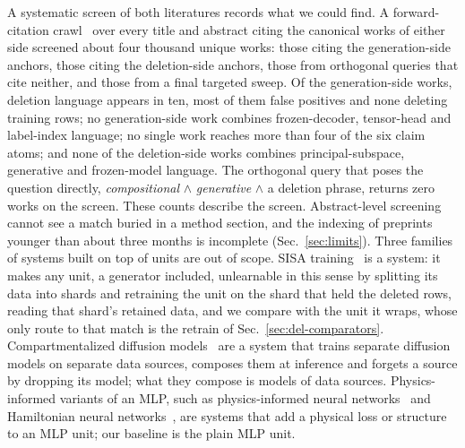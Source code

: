 \documentclass{article} %
\begin{document}
A systematic screen of both literatures records what we could find. A
forward-citation crawl~\citep{priem_openalex_2022} over every title and abstract citing the canonical works of either side
screened about four thousand unique works: those citing the generation-side anchors, those citing
the deletion-side anchors, those from orthogonal queries that cite neither, and those from
a final targeted sweep. %
Of the generation-side works, deletion language appears in ten, most of them
false positives and none deleting training rows; no generation-side work combines frozen-decoder, tensor-head
and label-index language; no single work reaches more than four of the six claim atoms;
and none of the deletion-side works combines principal-subspace, generative and
frozen-model language. %
The orthogonal query that poses the question directly, \emph{compositional} $\wedge$
\emph{generative} $\wedge$ a deletion phrase, returns zero works on the screen.
These counts describe the screen. Abstract-level
screening cannot see a match buried in a method section, and the indexing of preprints younger
than about three months is incomplete (Sec.~\ref{sec:limits}).
Three families of systems built on top of units are out of scope.
SISA training~\citep{bourtoule_machine_2021} is a system: it makes any unit, a generator included,
unlearnable in this sense by splitting its data into shards and retraining the unit on the shard that
held the deleted rows, reading that shard's retained data, and we compare with the unit it wraps,
whose only route to that match is the retrain of Sec.~\ref{sec:del-comparators}.
Compartmentalized diffusion models~\citep{golatkar_training_2024} are a system that
trains separate diffusion models on separate data sources, composes them at inference and forgets a
source by dropping its model; what they compose is models of data sources.
Physics-informed variants of an MLP, such as physics-informed neural
networks~\citep{raissi_physics-informed_2019} and Hamiltonian neural networks~\citep{greydanus_hamiltonian_2019}, are
systems that add a physical loss or structure to an MLP unit; our baseline is the plain MLP unit.
\end{document}
